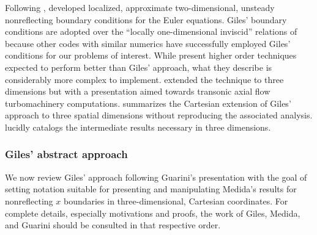 \documentclass[letterpaper,11pt,nointlimits,reqno,draft]{amsbook}
\begin{document}
Following \citet{Engquist1977Absorbing},
\citet{Giles1988Nonreflecting,Giles1990Nonreflecting} developed localized,
approximate two-dimensional, unsteady nonreflecting boundary conditions for the
Euler equations.  Giles' boundary conditions are adopted over the ``locally
one-dimensional inviscid'' relations of \citet{Poinsot1992Boundary} because
other codes with similar numerics have successfully employed Giles' conditions
for our problems of interest.  While \citet{Rowley2000Discretely} present
higher order techniques expected to perform better than Giles' approach, what
they describe is considerably more complex to implement.
\citet{Saxer1993QuasiThreeDimensional} extended the technique to three
dimensions but with a presentation aimed towards transonic axial flow
turbomachinery computations.  \citet{Guarini1998} summarizes the Cartesian
extension of Giles' approach to three spatial dimensions without reproducing
the associated analysis.  \citet{Medida2007} lucidly catalogs the intermediate
results necessary in three dimensions.

\subsubsection{Giles' abstract approach}

We now review Giles' approach following Guarini's presentation with the goal of
setting notation suitable for presenting and manipulating Medida's results for
nonreflecting $x$ boundaries in three-dimensional, Cartesian coordinates.  For
complete details, especially motivations and proofs, the work of Giles, Medida,
and Guarini should be consulted in that respective order.
\end{document}

